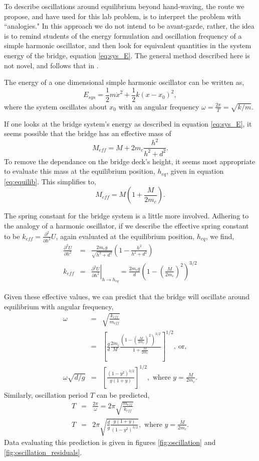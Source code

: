 \documentclass[12pt]{iopart}
\newcommand{\be}{\begin{equation}}
\newcommand{\ee}{\end{equation}}
\newcommand{\bea}{\begin{eqnarray}}
\newcommand{\eea}{\end{eqnarray}}
\begin{document}
To describe oscillations around equilibrium beyond hand-waving, the route we propose, and have used for this lab problem, is to interpret the problem with ``analogies."  In this approach we do not intend to be avant-garde, rather, the idea is to remind students of the energy formulation and oscillation frequency of a simple harmonic oscillator, and then look  for equivalent quantities in the system energy of the bridge, equation \ref{eq:sys_E}.  The general method described here is not novel, and follows that in \cite{bayman_hammermesh}.

The energy of a one dimensional simple harmonic oscillator can be written as,
\be
E_{sys}=\frac{1}{2}m \dot{x}^2 + \frac{1}{2}k(x-x_0)^2,
\ee
where the system oscillates about $x_0$ with an angular frequency $\omega=\frac{2 \pi}{T}=\sqrt{k/m}$.

If one looks at the bridge system's energy as described in equation \ref{eq:sys_E}, it seems possible that the bridge has an effective mass of 
\be
M_{eff}=M  +  2m_c  \frac{h^2}{h^2+d^2}.
\ee
To remove the dependance on the bridge deck's height, it seems most appropriate to evaluate this mass at the equilibrium position, $h_{eq}$, given in equation \ref{eq:equilib}.  This simplifies to,
\be
M_{eff}=M \left( 1+\frac{M}{2m_c}\right).
\ee

The spring constant for the bridge system is a little more involved.  Adhering to the analogy of a harmonic oscillator, if we describe the effective spring constant to be $k_{eff}=\frac{\partial^2}{\partial h^2}U$, again evaluated at the equilibrium position, $h_{eq}$,  we find, 
\bea
\frac{\partial^2 U}{\partial h^2} 
	&=& \frac{2 m_c g}
		{\sqrt{h^2+d^2}}
		\left( 1-\frac{h^2}{h^2+d^2} \right) \nonumber \\
k_{eff} &=& \left. \frac{\partial^2 U}{\partial h^2}\right|_{h\to h_{eq}}
	= \frac{2 m_c g}{d} 
		\left(1-\left(\frac{M}{2m_c}\right)^2 \right)^{3/2}
\eea

Given these effective values, we can predict that the bridge will oscillate around equilibrium with angular frequency,
\bea
\omega&=&\sqrt{\frac{k_{eff}}{m_{eff}} } \nonumber\\
&=& \left[ \frac{g}{d} \frac{2 m_c}{M} \frac{(1-(\frac{M}{2m_c})^2)^{3/2}}{1+\frac{M}{2m_c}} \right]^{1/2},~\textrm{or},\nonumber\\
\omega \sqrt{d/g} &=& \left[ \frac{(1-y^2)^{3/2}}{y(1+y)} \right]^{1/2}, \textrm{~where~} y=\frac{M}{2m_c}.
\label{eq:omega}
\eea
Similarly, oscillation period $T$ can be predicted,  
\bea
T&=&\frac{2 \pi}{\omega}=2 \pi \sqrt{\frac{m_{eff}}{k_{eff}} } \nonumber \\
T &=& 2 \pi \sqrt{
	\frac{d}{g} 
	\frac	{y(1+y)}
		{\left(1-y^2\right)^{3/2}} 
}, \textrm{~where~} y=\frac{M}{2m_c} \label{eq:period}.
\eea
Data evaluating this prediction is given in figures \ref{fig:oscillation} and \ref{fig:oscillation_residuals}.
\end{document}
